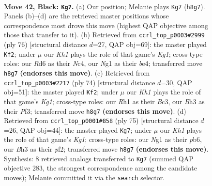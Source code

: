 \documentclass[11pt]{article}
\begin{document}
\clearpage

\begin{figure}[p]\centering
\begin{subfigure}{0.46\textwidth}\centering
\resizebox{\linewidth}{!}{%
\newchessgame
\chessboard[
  setfen={R6k/5p1p/3r2p1/8/1p2P3/6Pb/7P/4K1nr b - - 1 42},
  showmover=false,
  pgfstyle=straightmove, color=movearrow, markmove={h8-g7}
]}
\caption{}
\end{subfigure}\hfill
\begin{subfigure}{0.46\textwidth}\centering
\resizebox{\linewidth}{!}{%
\newchessgame
\chessboard[
  setfen={6r1/3k3p/7R/5p2/2NpbP2/8/PP5P/6K1 w - - 2 39},
  showmover=false,
  pgfstyle=straightmove, color=movearrow, markmove={g1-f2}
]}
\caption{}
\end{subfigure}
\\[4pt]
\begin{subfigure}{0.46\textwidth}\centering
\resizebox{\linewidth}{!}{%
\newchessgame
\chessboard[
  setfen={6k1/5p2/5Rpp/8/b7/2B1PPP1/7P/1r4K1 w - - 2 38},
  showmover=false,
  pgfstyle=straightmove, color=movearrow, markmove={g1-f2}
]}
\caption{}
\end{subfigure}\hfill
\begin{subfigure}{0.46\textwidth}\centering
\resizebox{\linewidth}{!}{%
\newchessgame
\chessboard[
  setfen={2R3k1/1p5p/pP2p1p1/8/6rP/8/P4P2/4K3 b - - 1 38},
  showmover=false,
  pgfstyle=straightmove, color=movearrow, markmove={g8-g7}
]}
\caption{}
\end{subfigure}
\caption{\textbf{Move 42, Black: \texttt{Kg7}.} (a) Our position; Melanie plays \texttt{Kg7} (\texttt{h8g7}). Panels (b)--(d) are the retrieved master positions whose correspondence most drove this move (highest QAP objective among those that transfer to it). (b) Retrieved from \texttt{ccrl\_top\_p0003\#2999} (ply 76) [structural distance $d$=27, QAP obj=69]: the master played \texttt{Kf2}; under $\mu$ our \emph{Kh1} plays the role of that game's \emph{Kg1}; cross-type roles: our \emph{R}d6 as their \emph{N}c4, our \emph{N}g1 as their \emph{b}e4; transferred move \texttt{h8g7} \textbf{(endorses this move)}. (c) Retrieved from \texttt{ccrl\_top\_p0003\#2217} (ply 74) [structural distance $d$=30, QAP obj=51]: the master played \texttt{Kf2}; under $\mu$ our \emph{Kh1} plays the role of that game's \emph{Kg1}; cross-type roles: our \emph{R}h1 as their \emph{B}c3, our \emph{B}h3 as their \emph{P}f3; transferred move \texttt{h8g7} \textbf{(endorses this move)}. (d) Retrieved from \texttt{ccrl\_top\_p0001\#858} (ply 75) [structural distance $d$=26, QAP obj=44]: the master played \texttt{Kg7}; under $\mu$ our \emph{Kh1} plays the role of that game's \emph{Kg1}; cross-type roles: our \emph{N}g1 as their \emph{p}b6, our \emph{B}h3 as their \emph{p}f2; transferred move \texttt{h8g7} \textbf{(endorses this move)}. Synthesis: 8 retrieved analogs transferred to \texttt{Kg7} (summed QAP objective 283, the strongest correspondence among the candidate moves); Melanie committed it via the \texttt{search} selector.}
\label{fig:thought-m83}
\end{figure}
\end{document}
